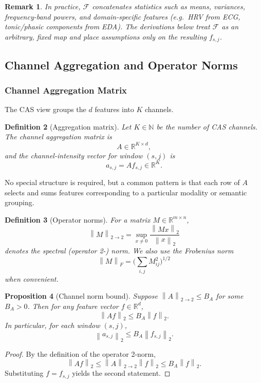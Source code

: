 \documentclass[11pt]{article}
\newtheorem{definition}{Definition}[section]
\newtheorem{proposition}[definition]{Proposition}
\newtheorem{remark}[definition]{Remark}
\newcommand{\N}{\mathbb{N}}
\newcommand{\R}{\mathbb{R}}
\newcommand{\norm}[1]{\left\lVert #1 \right\rVert}
\begin{document}
\begin{remark}
In practice, \(\mathcal{F}\) concatenates statistics such as means, variances, frequency-band powers, and domain-specific features (e.g.~HRV from ECG, tonic/phasic components from EDA). The derivations below treat \(\mathcal{F}\) as an arbitrary, fixed map and place assumptions only on the resulting \(f_{s,j}\).
\end{remark}

\subsection{Channel Aggregation and Operator Norms}

\subsubsection{Channel Aggregation Matrix}

The CAS view groups the \(d\) features into \(K\) channels.

\begin{definition}[Aggregation matrix]
Let \(K \in \N\) be the number of CAS channels.
The channel aggregation matrix is
\[
  A \in \R^{K \times d},
\]
and the channel-intensity vector for window \((s,j)\) is
\[
  a_{s,j} = A f_{s,j} \in \R^K.
\]
\end{definition}

No special structure is required, but a common pattern is that each row of \(A\) selects and sums features corresponding to a particular modality or semantic grouping.

\begin{definition}[Operator norms]
For a matrix \(M \in \R^{m \times n}\),
\[
  \norm{M}_{2\to 2} = \sup_{x \ne 0} \frac{\norm{M x}_2}{\norm{x}_2}
\]
denotes the spectral (operator 2-) norm. We also use the Frobenius norm
\[
  \norm{M}_F = \biggl( \sum_{i,j} M_{ij}^2 \biggr)^{1/2}
\]
when convenient.
\end{definition}

\begin{proposition}[Channel norm bound]
Suppose \(\norm{A}_{2\to 2} \le B_A\) for some \(B_A > 0\).
Then for any feature vector \(f \in \R^d\),
\[
  \norm{A f}_2 \le B_A \norm{f}_2.
\]
In particular, for each window \((s,j)\),
\[
  \norm{a_{s,j}}_2 \le B_A \norm{f_{s,j}}_2.
\]
\end{proposition}

\begin{proof}
By the definition of the operator 2-norm,
\[
  \norm{A f}_2 \le \norm{A}_{2\to2} \norm{f}_2 \le B_A \norm{f}_2.
\]
Substituting \(f = f_{s,j}\) yields the second statement.
\end{proof}
\end{document}
